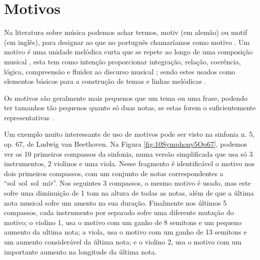 \section{Motivos}
\label{sec:Motivo}

Na literatura sobre música podemos achar  termos, motiv (em alemão) ou motif (em inglês),
para designar ao que no português chamaríamos como motivo \cite[pp. 984]{latham2008diccionario}.
Um motivo é uma unidade melódica curta que se repete ao longo de uma composição musical \cite[pp. 545]{apel1969harvard},
esta tem como intenção proporcionar integração, relação, coerência, lógica, 
compreensão e fluidez ao discurso musical \cite[pp. 984]{latham2008diccionario};
sendo estes usados como elementos básicos para a construção
de temas e linhas melódicas \cite[pp. 984]{latham2008diccionario}.

Os motivos são geralmente mais pequenos que um tema ou uma frase,
podendo ter tamanhos tão pequenos quanto só duas notas,
se estas forem o suficientemente representativas \cite[pp. 545]{apel1969harvard}.


\begin{example}
Um exemplo muito interessante de uso de motivos pode ser visto na sinfonia n. 5, op. 67, 
de Ludwig van Beethoven.
Na Figura \ref{fig:10Symphony5Op67}, podemos ver os 10 primeiros compassos da sinfonia,
numa versão simplificada que usa só 3 instrumentos, 2 violinos e uma viola.
Nesse fragmento é identificável o motivo nos dois primeiros compassos,
com um conjunto de notas correspondentes a ``sol~sol~sol~mi$\flat$''.
Nos seguintes 3 compassos, o mesmo motivo é usado, 
mas este sofre uma diminuição de 1 tom na altura de todas as notas, 
além de que a última nota musical sofre um amento na sua duração. 
Finalmente nos últimos 5 compassos, cada instrumento por separado sofre uma diferente mutação do motivo;
o violino 1, usa o motivo com um ganho de 8 semitons e um pequeno aumento da ultima nota;
a viola, usa o motivo com um ganho de 13 semitons e um aumento considerável da última nota; e
o violino 2, usa o motivo com um importante aumento na longitude da última nota.
\end{example}


